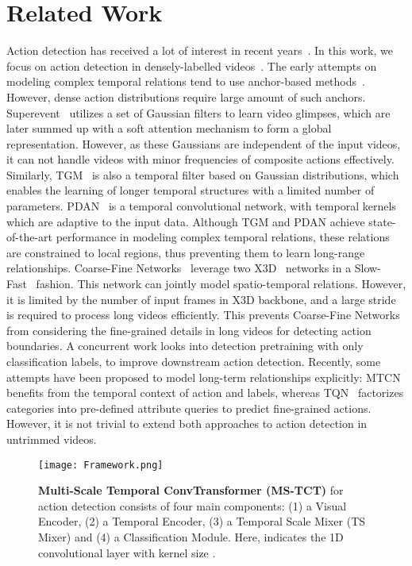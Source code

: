 \documentclass[10pt,twocolumn,letterpaper]{article}
\begin{document}
\section{Related Work}
\label{sec:relate}
Action detection has received a lot of interest in recent years~\cite{gleason2019proposal,lin2017single,gtad,Damen2018EPICKITCHENS,dai2019tan,zhao2019hacs,Dai_2021_ICCV}. In this work, we focus on action detection in densely-labelled videos~\cite{charades,dai2020toyota,multi-thumos}. The early attempts on modeling complex temporal relations tend to use anchor-based methods~\cite{RC3d,AFNET}. However, dense action distributions require large amount of such anchors. Superevent~\cite{superevent} utilizes a set of Gaussian filters to learn video glimpses, which are later summed up with a soft attention mechanism to form a global representation. 
However, as these Gaussians are independent of the input videos, it can not handle videos with minor frequencies of composite actions effectively.
Similarly, TGM~\cite{TGM1} is also a temporal filter based on Gaussian distributions, which enables the learning of longer temporal structures with a limited number of parameters. 
PDAN~\cite{Dai_2021_WACV} is a temporal convolutional network, with temporal kernels which are adaptive to the input data. Although TGM and PDAN achieve state-of-the-art performance in modeling complex temporal relations, these relations are constrained to local regions, thus preventing them to learn long-range relationships. Coarse-Fine Networks~\cite{kahatapitiya2021coarse} leverage two X3D~\cite{x3d} networks in a Slow-Fast~\cite{slow_fast} fashion. This network can jointly model spatio-temporal relations. However, it is limited by the number of input frames in X3D backbone, and a large stride is required to process long videos efficiently. This prevents Coarse-Fine Networks from considering the fine-grained details in long videos for detecting action boundaries. A concurrent work \cite{kahatapitiya2021self} looks into detection pretraining with only classification labels, to improve downstream action detection.
Recently, some attempts have been proposed to model long-term relationships explicitly: MTCN~\cite{kazakos2021MTCN} benefits from the temporal context of action and labels, whereas TQN~\cite{zhangtqn} factorizes categories into pre-defined attribute queries to predict fine-grained actions. However, it is not trivial to extend both approaches to action detection in untrimmed videos. 

\begin{figure*}[t!]
\centering
\texttt{[image: Framework.png]}\vspace{-0.1in}
\caption{\textbf{Multi-Scale Temporal ConvTransformer (MS-TCT)} for action detection consists of four main components: (1) a Visual Encoder, (2) a Temporal Encoder, 
(3) a Temporal Scale Mixer (TS Mixer) and 
(4) a Classification Module. Here,  indicates the 1D convolutional layer with kernel size . 
}
\label{fig:main}
\end{figure*}
\end{document}
